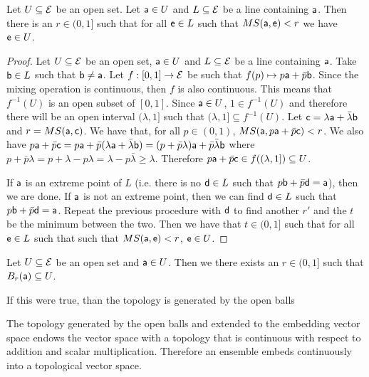 \begin{prop}
	Let $U \subseteq \Ens$ be an open set. Let $\ens[a] \in U$ and $L \subseteq \Ens$ be a line containing $\ens[a]$. Then there is an $r \in (0,1]$ such that for all $\ens \in L$ such that $MS(\ens[a], \ens) < r$ we have $\ens \in U$.
\end{prop}

\begin{proof}
	Let $U \subseteq \Ens$ be an open set, $\ens[a] \in U$ and $L \subseteq \Ens$ be a line containing $\ens[a]$. Take $\ens[b] \in L$ such that $\ens[b] \neq \ens[a]$. Let $f : [0,1] \to \Ens$ be such that $f(p) \mapsto p \ens[a] + \bar{p} \ens[b]$. Since the mixing operation is continuous, then $f$ is also continuous. This means that $f^{-1}(U)$ is an open subset of $[0,1]$. Since $\ens[a] \in U$, $1 \in f^{-1}(U)$ and therefore there will be an open interval $(\lambda, 1]$ such that $(\lambda, 1] \subseteq f^{-1}(U)$. Let $\ens[c] = \lambda \ens[a] + \bar{\lambda} \ens[b]$ and $r = MS(\ens[a], \ens[c])$. We have that, for all $p \in (0,1)$, $MS(\ens[a], p\ens[a] +\bar{p}\ens[c])<r$. We also have $p\ens[a] +\bar{p}\ens[c] = p\ens[a] +\bar{p}(\lambda \ens[a] + \bar{\lambda} \ens[b]) = (p + \bar{p}\lambda)\ens[a] + \bar{p}\bar{\lambda}\ens[b]$ where $p + \bar{p}\lambda = p + \lambda - p\lambda = \lambda - p\bar{\lambda} \geq \lambda$. Therefore $p\ens[a] +\bar{p}\ens[c] \in f((\lambda,1]) \subseteq U$.
	
	If $\ens[a]$ is an extreme point of $L$ (i.e. there is no $\ens[d] \in L$ such that $p\ens[b] + \bar{p}\ens[d] = \ens[a]$), then we are done. If $\ens[a]$ is not an extreme point, then we can find $\ens[d] \in L$ such that $p\ens[b] + \bar{p}\ens[d] = \ens[a]$. Repeat the previous procedure with $\ens[d]$ to find another $r'$ and the $t$ be the minimum between the two. Then we have that $t \in (0,1]$ such that for all $\ens \in L$ such that such that $MS(\ens[a], \ens) < r$, $\ens \in U$.
\end{proof}

\begin{conj}
	Let $U \subseteq \Ens$ be an open set and $\ens[a] \in U$. Then we there exists an $r \in (0,1]$ such that $B_r(\ens[a]) \subseteq U$.
\end{conj}

\begin{remark}
	If this were true, than the topology is generated by the open balls
\end{remark}

\begin{conj}
	The topology generated by the open balls and extended to the embedding vector space endows the vector space with a topology that is continuous with respect to addition and scalar multiplication. Therefore an ensemble embeds continuously into a topological vector space.
\end{conj}

